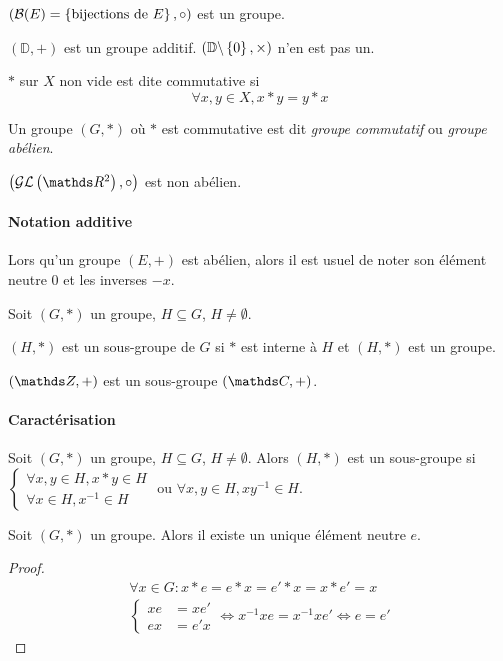 $(\mathcal{B}(E) = \left\{\text{bijections de $E$}\right\}, \circ)$ est un groupe.

$(\mathbb{D},+)$ est un groupe additif. $(\mathbb{D}\backslash\left\{0\right\},\times)$ n'en est pas un.

\begin{definition}[Commutativité]
  $*$ sur $X$ non vide est dite commutative si
  \[
    \forall x, y \in X, x*y = y*x
  \]
\end{definition}

\begin{definition}
   Un groupe $(G,*)$ où $*$ est commutative est dit \emph{groupe commutatif} ou
   \emph{groupe abélien}.
\end{definition}

$\parenthesis{\mathcal{GL}\parenthesis{\RR^2}, \circ}$ est non abélien.

\paragraph{Notation additive}
  Lors qu'un groupe $(E,+)$ est abélien, alors il est usuel de noter son
  élément neutre $0$ et les inverses $-x$.

\begin{definition}
  Soit $(G,*)$ un groupe, $H\subseteq G$, $H\neq \emptyset$.

  $(H,*)$ est un sous-groupe de $G$ si $*$ est interne à $H$ et $(H,*)$ est un groupe.
\end{definition}

$(\ZZ,+)$ est un sous-groupe $(\CC,+)$.

\paragraph{Caractérisation}
  Soit $(G,*)$ un groupe, $H\subseteq G$, $H\neq \emptyset$.
  Alors $(H,*)$ est un sous-groupe si $\begin{cases}
    \forall x,y\in H, x*y\in H\\
    \forall x\in H, x^{-1} \in H
  \end{cases}$ ou $\forall x,y \in H, xy^{-1}\in H$.


\begin{proposition}
  Soit $(G,*)$ un groupe. Alors il existe un unique élément neutre $e$.
\end{proposition}

\begin{proof}
  \begin{eqnarray*}
    \forall x \in G: x*e=e*x = e'*x = x*e' = x\\
    \begin{cases}
      xe &= xe'\\
      ex &= e'x
    \end{cases} \iff
      x^{-1}xe = x^{-1}xe' \iff e= e'
  \end{eqnarray*}
\end{proof}

